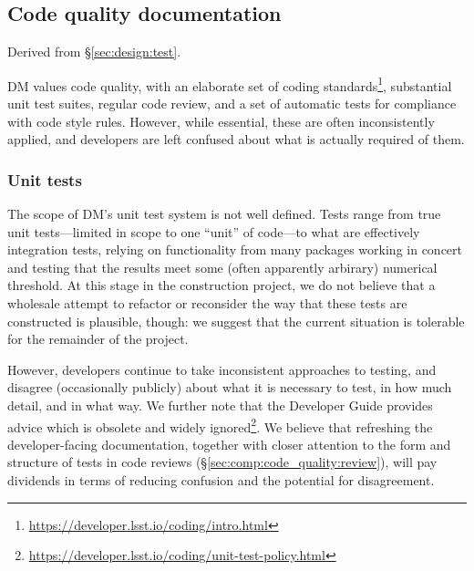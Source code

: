 \subsection{Code quality documentation}
\label{sec:comp:code_quality}

Derived from \S\ref{sec:design:test}.

DM values code quality, with an elaborate set of coding standards\footnote{\url{https://developer.lsst.io/coding/intro.html}}, substantial unit test suites, regular code review, and a set of automatic tests for compliance with code style rules.
However, while essential, these are often inconsistently applied, and developers are left confused about what is actually required of them.

\subsubsection{Unit tests}
\label{sec:comp:code_quality:unittest}

The scope of DM's unit test system is not well defined.
Tests range from true unit tests---limited in scope to one ``unit'' of code---to what are effectively integration tests, relying on functionality from many packages working in concert and testing that the results meet some (often apparently arbirary) numerical threshold.
At this stage in the construction project, we do not believe that a wholesale attempt to refactor or reconsider the way that these tests are constructed is plausible, though: we suggest that the current situation is tolerable for the remainder of the project.

However, developers continue to take inconsistent approaches to testing, and disagree (occasionally publicly) about what it is necessary to test, in how much detail, and in what way.
We further note that the Developer Guide provides advice which is obsolete and widely ignored\footnote{\url{https://developer.lsst.io/coding/unit-test-policy.html}}.
We believe that refreshing the developer-facing documentation, together with closer attention to the form and structure of tests in code reviews (\S\ref{sec:comp:code_quality:review}), will pay dividends in terms of reducing confusion and the potential for disagreement.

